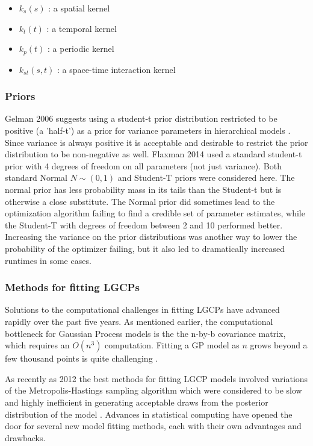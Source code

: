 \begin{itemize}
  \item $k_s(s)$ : a spatial kernel
  \item $k_t(t)$ : a temporal kernel
  \item $k_p(t)$ : a periodic kernel
  \item $k_{st}(s,t)$ : a space-time interaction kernel
\end{itemize}



\subsubsection{Priors}

Gelman 2006 suggests using a student-t prior distribution restricted to be positive (a 'half-t') as a prior for variance parameters in hierarchical models \cite{gelman_2006}. Since variance is always positive it is acceptable and desirable to restrict the prior distribution to be non-negative as well. Flaxman 2014 used a standard student-t prior with 4 degrees of freedom on all parameters (not just variance). Both standard Normal $N \sim (0,1)$ and Student-T priors were considered here. The normal prior has less probability mass in its tails than the Student-t but is otherwise a close substitute. The Normal prior did sometimes lead to the optimization algorithm failing to find a credible set of parameter estimates, while the Student-T with degrees of freedom between 2 and 10 performed better. Increasing the variance on the prior distributions was another way to lower the probability of the optimizer failing, but it also led to dramatically increased runtimes in some cases.

\subsubsection{Methods for fitting LGCPs}

Solutions to the computational challenges in fitting LGCPs have advanced rapidly over the past five years. As mentioned earlier, the computational bottleneck for Gaussian Process models is the the n-by-b covariance matrix, which requires an $O(n^3)$ computation. Fitting a GP model as $n$ grows beyond a few thousand points is quite challenging \cite{gelman2013bayesian}. \par

 As recently as 2012 the best methods for fitting LGCP models involved variations of the Metropolis-Hastings sampling algorithm which were considered to be slow and highly inefficient in generating acceptable draws from the posterior distribution of the model \cite{murray_2012}. Advances in statistical computing have opened the door for several new model fitting methods, each with their own advantages and drawbacks.


